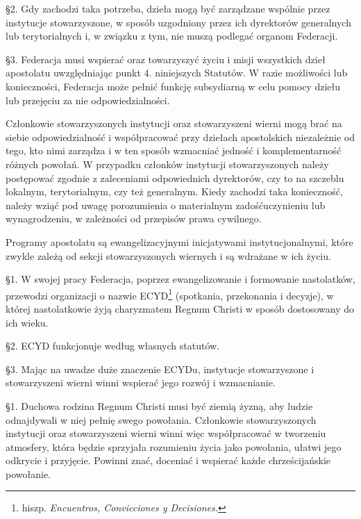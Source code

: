 \S{}2.  Gdy zachodzi taka potrzeba, dzieła mogą być zarządzane wspólnie przez instytucje stowarzyszone, w sposób uzgodniony przez ich dyrektorów generalnych lub terytorialnych i, w związku z tym, nie muszą podlegać organom Federacji.


\S{}3. Federacja musi wspierać oraz towarzyszyć życiu i misji wszystkich dzieł apostolatu uwzględniając punkt 4. niniejszych Statutów. W razie możliwości lub konieczności, Federacja może pełnić funkcję subsydiarną w celu pomocy dziełu lub przejęciu za nie odpowiedzialności.
 
 
 Członkowie stowarzyszonych instytucji oraz stowarzyszeni wierni mogą brać na siebie odpowiedzialność i współpracować przy dziełach apostolskich niezależnie od tego, kto nimi zarządza i w ten sposób wzmacniać jedność i komplementarność różnych powołań. W przypadku członków instytucji stowarzyszonych należy postępować zgodnie z zaleceniami odpowiednich dyrektorów, czy to na szczeblu lokalnym, terytorialnym, czy też generalnym. Kiedy zachodzi taka konieczność, należy wziąć pod uwagę porozumienia o materialnym zadośćuczynieniu lub wynagrodzeniu, w zależności od przepisów prawa cywilnego.
 
 
 Programy apostolatu są ewangelizacyjnymi inicjatywami instytucjonalnymi, które zwykle zależą od sekcji stowarzyszonych wiernych i są wdrażane w ich życiu.
 
 
 \S{}1. W swojej pracy Federacja, poprzez ewangelizowanie i formowanie nastolatków, przewodzi organizacji o nazwie ECYD\footnote{hiszp. {\em Encuentros, Convicciones y Decisiones.}} (spotkania, przekonania i decyzje), w której nastolatkowie żyją charyzmatem Regnum Christi w sposób dostosowany do ich wieku.


\S{}2. ECYD funkcjonuje według własnych statutów.


\S{}3. Mając na uwadze duże znaczenie ECYDu, instytucje stowarzyszone i stowarzyszeni wierni winni wspierać jego rozwój i wzmacnianie.
 
 
 \S{}1. Duchowa rodzina Regnum Christi musi być ziemią żyzną, aby ludzie odnajdywali w niej pełnię swego powołania. Członkowie stowarzyszonych instytucji oraz stowarzyszeni wierni winni więc współpracować w tworzeniu atmosfery, która będzie sprzyjała rozumieniu życia jako powołania, ułatwi jego odkrycie i przyjęcie. Powinni  znać, doceniać i wspierać każde chrześcijańskie powołanie.


